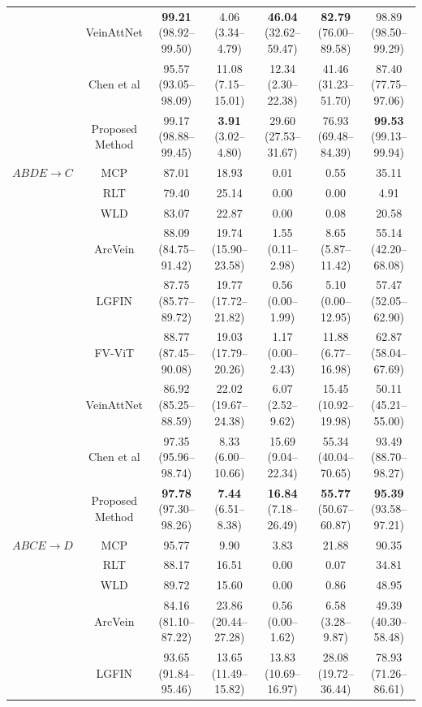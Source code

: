 \documentclass[11pt]{article}
\begin{document}
\begin{table}[ht!]
{\begin{tabular}{|c|c|c|c|c|c|c|}
         & VeinAttNet & \textbf{99.21} (98.92--99.50) & 4.06 (3.34--4.79) & \textbf{46.04} (32.62--59.47) & \textbf{82.79} (76.00--89.58) & 98.89 (98.50--99.29) \\
         & Chen et al & 95.57 (93.05--98.09) & 11.08 (7.15--15.01) & 12.34 (2.30--22.38) & 41.46 (31.23--51.70) & 87.40 (77.75--97.06) \\
         & Proposed Method & 99.17 (98.88--99.45) & \textbf{3.91} (3.02--4.80) & 29.60 (27.53--31.67) & 76.93 (69.48--84.39) & \textbf{99.53} (99.13--99.94) \\
        \hline
        $ABDE \rightarrow C$ & MCP & 87.01 & 18.93 & 0.01 & 0.55 & 35.11 \\
         & RLT & 79.40 & 25.14 & 0.00 & 0.00 & 4.91 \\
         & WLD & 83.07 & 22.87 & 0.00 & 0.08 & 20.58 \\
         & ArcVein & 88.09 (84.75--91.42) & 19.74 (15.90--23.58) & 1.55 (0.11--2.98) & 8.65 (5.87--11.42) & 55.14 (42.20--68.08) \\
         & LGFIN & 87.75 (85.77--89.72) & 19.77 (17.72--21.82) & 0.56 (0.00--1.99) & 5.10 (0.00--12.95) & 57.47 (52.05--62.90) \\
         & FV-ViT & 88.77 (87.45--90.08) & 19.03 (17.79--20.26) & 1.17 (0.00--2.43) & 11.88 (6.77--16.98) & 62.87 (58.04--67.69) \\
         & VeinAttNet & 86.92 (85.25--88.59) & 22.02 (19.67--24.38) & 6.07 (2.52--9.62) & 15.45 (10.92--19.98) & 50.11 (45.21--55.00) \\
         & Chen et al & 97.35 (95.96--98.74) & 8.33 (6.00--10.66) & 15.69 (9.04--22.34) & 55.34 (40.04--70.65) & 93.49 (88.70--98.27) \\
         & Proposed Method & \textbf{97.78} (97.30--98.26) & \textbf{7.44} (6.51--8.38) & \textbf{16.84} (7.18--26.49) & \textbf{55.77} (50.67--60.87) & \textbf{95.39} (93.58--97.21) \\
        \hline
        $ABCE \rightarrow D$ & MCP & 95.77 & 9.90 & 3.83 & 21.88 & 90.35 \\
         & RLT & 88.17 & 16.51 & 0.00 & 0.07 & 34.81 \\
         & WLD & 89.72 & 15.60 & 0.00 & 0.86 & 48.95 \\
         & ArcVein & 84.16 (81.10--87.22) & 23.86 (20.44--27.28) & 0.56 (0.00--1.62) & 6.58 (3.28--9.87) & 49.39 (40.30--58.48) \\
         & LGFIN & 93.65 (91.84--95.46) & 13.65 (11.49--15.82) & 13.83 (10.69--16.97) & 28.08 (19.72--36.44) & 78.93 (71.26--86.61) \\

\end{tabular}}
\end{table}
\end{document}
